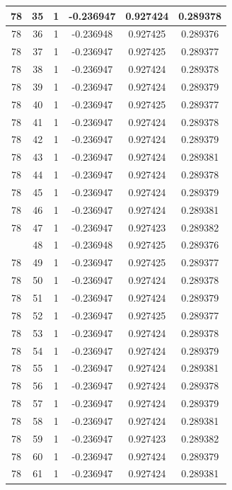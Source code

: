 \documentclass[12pt,a4paper]{article}
\numberwithin{equation}{section}
\numberwithin{figure}{section}
\numberwithin{table}{section}
\begin{document}
\begin{longtable}{|c|c|c|c|c|c|}
78 & 35 & 1 & -0.236947 & 0.927424 & 0.289378 \\ \hline
78 & 36 & 1 & -0.236948 & 0.927425 & 0.289376 \\ \hline
78 & 37 & 1 & -0.236947 & 0.927425 & 0.289377 \\ \hline
78 & 38 & 1 & -0.236947 & 0.927424 & 0.289378 \\ \hline
78 & 39 & 1 & -0.236947 & 0.927424 & 0.289379 \\ \hline
78 & 40 & 1 & -0.236947 & 0.927425 & 0.289377 \\ \hline
78 & 41 & 1 & -0.236947 & 0.927424 & 0.289378 \\ \hline
78 & 42 & 1 & -0.236947 & 0.927424 & 0.289379 \\ \hline
78 & 43 & 1 & -0.236947 & 0.927424 & 0.289381 \\ \hline
78 & 44 & 1 & -0.236947 & 0.927424 & 0.289378 \\ \hline
78 & 45 & 1 & -0.236947 & 0.927424 & 0.289379 \\ \hline
78 & 46 & 1 & -0.236947 & 0.927424 & 0.289381 \\ \hline
78 & 47 & 1 & -0.236947 & 0.927423 & 0.289382 \\ \hline
\pagebreak
78 & 48 & 1 & -0.236948 & 0.927425 & 0.289376 \\ \hline
78 & 49 & 1 & -0.236947 & 0.927425 & 0.289377 \\ \hline
78 & 50 & 1 & -0.236947 & 0.927424 & 0.289378 \\ \hline
78 & 51 & 1 & -0.236947 & 0.927424 & 0.289379 \\ \hline
78 & 52 & 1 & -0.236947 & 0.927425 & 0.289377 \\ \hline
78 & 53 & 1 & -0.236947 & 0.927424 & 0.289378 \\ \hline
78 & 54 & 1 & -0.236947 & 0.927424 & 0.289379 \\ \hline
78 & 55 & 1 & -0.236947 & 0.927424 & 0.289381 \\ \hline
78 & 56 & 1 & -0.236947 & 0.927424 & 0.289378 \\ \hline
78 & 57 & 1 & -0.236947 & 0.927424 & 0.289379 \\ \hline
78 & 58 & 1 & -0.236947 & 0.927424 & 0.289381 \\ \hline
78 & 59 & 1 & -0.236947 & 0.927423 & 0.289382 \\ \hline
78 & 60 & 1 & -0.236947 & 0.927424 & 0.289379 \\ \hline
78 & 61 & 1 & -0.236947 & 0.927424 & 0.289381 \\ \hline

\end{longtable}
\end{document}

